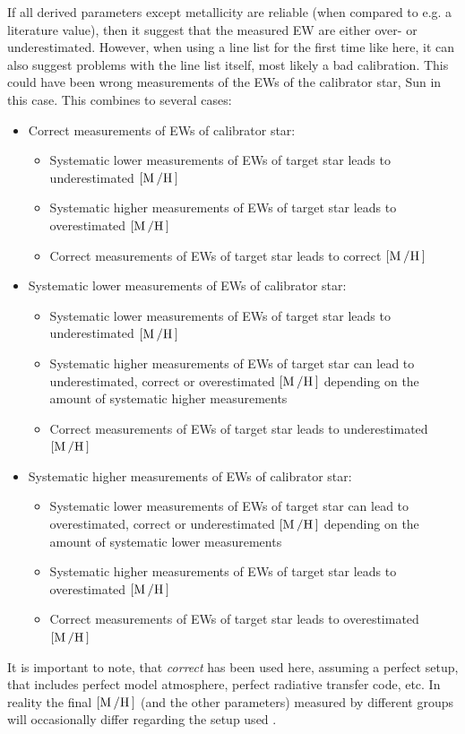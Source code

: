 If all derived parameters except metallicity are reliable (when compared to e.g. a literature
value), then it suggest that the measured EW are either over- or underestimated. However, when using
a line list for the first time like here, it can also suggest problems with the line list itself,
most likely a bad calibration. This could have been wrong measurements of the EWs of the calibrator
star, Sun in this case. This combines to several cases:
\begin{itemize}
  \item Correct measurements of EWs of calibrator star:
  \begin{itemize}
    \item Systematic lower measurements of EWs of target star leads to underestimated $[\ion{M}/\ion{H}]$
    \item Systematic higher measurements of EWs of target star leads to overestimated $[\ion{M}/\ion{H}]$
    \item Correct measurements of EWs of target star leads to correct $[\ion{M}/\ion{H}]$
  \end{itemize}
  \item Systematic lower measurements of EWs of calibrator star:
  \begin{itemize}
    \item Systematic lower measurements of EWs of target star leads to underestimated $[\ion{M}/\ion{H}]$
    \item Systematic higher measurements of EWs of target star can lead to underestimated, correct or
          overestimated $[\ion{M}/\ion{H}]$ depending on the amount of systematic higher measurements
    \item Correct measurements of EWs of target star leads to underestimated $[\ion{M}/\ion{H}]$
  \end{itemize}
  \item Systematic higher measurements of EWs of calibrator star:
  \begin{itemize}
    \item Systematic lower measurements of EWs of target star can lead to overestimated, correct or
          underestimated $[\ion{M}/\ion{H}]$ depending on the amount of systematic lower measurements
    \item Systematic higher measurements of EWs of target star leads to overestimated $[\ion{M}/\ion{H}]$
    \item Correct measurements of EWs of target star leads to overestimated $[\ion{M}/\ion{H}]$
  \end{itemize}
\end{itemize}
It is important to note, that \emph{correct} has been used here, assuming a perfect setup, that
includes perfect model atmosphere, perfect radiative transfer code, etc. In reality the final
$[\ion{M}/\ion{H}]$ (and the other parameters) measured by different groups will occasionally differ
regarding the setup used \citep[see e.g.][]{Hinkel2016}.

